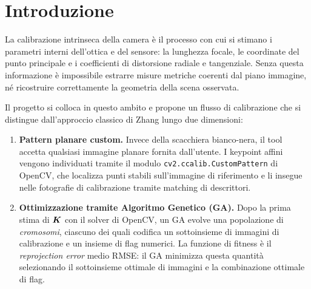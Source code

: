 \section{Introduzione}

La calibrazione intrinseca della camera è il processo con cui si stimano
i parametri interni dell'ottica e del sensore: la lunghezza focale, le
coordinate del punto principale e i coefficienti di distorsione radiale
e tangenziale. Senza questa informazione è impossibile estrarre misure
metriche coerenti dal piano immagine, né ricostruire correttamente la
geometria della scena osservata.

Il progetto si colloca in questo ambito e propone un
flusso di calibrazione che si distingue dall'approccio classico di
Zhang lungo due dimensioni:

\begin{enumerate}[label=\arabic*.]
  \item \textbf{Pattern planare custom.} Invece della scacchiera
        bianco-nera, il tool accetta qualsiasi immagine planare fornita
        dall'utente. I keypoint affini vengono individuati tramite il
        modulo \texttt{cv2.ccalib.CustomPattern} di
        OpenCV, che localizza punti stabili
        sull'immagine di riferimento e li insegue nelle fotografie di
        calibrazione tramite matching di descrittori.

  \item \textbf{Ottimizzazione tramite Algoritmo Genetico (GA).}
        Dopo la prima stima di \(\boldsymbol{K}\) con il solver di OpenCV,
        un GA evolve una popolazione di \emph{cromosomi}, ciascuno dei
        quali codifica un sottoinsieme di immagini di calibrazione e un
        insieme di flag numerici. La funzione di fitness è il
        \emph{reprojection error} medio RMSE: il GA minimizza questa
        quantità selezionando il sottoinsieme ottimale di immagini e la
        combinazione ottimale di flag.
\end{enumerate}

\newpage